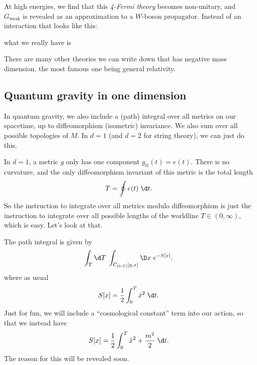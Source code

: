 \documentclass[a4paper]{article}
\begin{document}
At high energies, we find that this \emph{4-Fermi theory} becomes non-unitary, and $G_{\mathrm{weak}}$ is revealed as an approximation to a $W$-boson propagator. Instead of an interaction that looks like this:
\begin{center}
\end{center}
what we really have is
\begin{center}
\end{center}
There are many other theories we can write down that has negative mass dimension, the most famous one being general relativity.

\subsection{Quantum gravity in one dimension}
In quantum gravity, we also include a (path) integral over all metrics on our spacetime, up to diffeomorphism (isometric) invariance. We also sum over all possible topologies of $M$. In $d = 1$ (and $d = 2$ for string theory), we can just do this.

In $d = 1$, a metric $g$ only has one component $g_{tt}(t) = e(t)$. There is no curvature, and the only diffeomorphism invariant of this metric is the total length
\[
  T = \oint e(t) \;\d t.
\]
So the instruction to integrate over all metrics modulo diffeomorphism is just the instruction to integrate over all possible lengths of the worldline $T \in (0, \infty)$, which is easy. Let's look at that.

The path integral is given by
\[
  \int_T \d T \;\int_{C_{[0, T]} [y, x]} \D x\; e^{-S[x]}.
\]
where as usual
\[
  S[x] = \frac{1}{2} \int_0^T \dot{x}^2 \;\d t.
\]
Just for fun, we will include a ``cosmological constant'' term into our action, so that we instead have
\[
  S[x] = \frac{1}{2} \int_0^T \dot{x}^2 + \frac{m^2}{2}\;\d t.
\]
The reason for this will be revealed soon.
\end{document}
